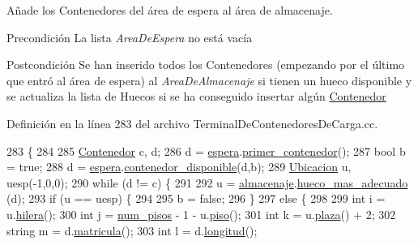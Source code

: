 Añade los Contenedores del área de espera al área de almacenaje. 

\begin{DoxyPrecond}{Precondición}
La lista {\itshape Area\+De\+Espera} no está vacía 
\end{DoxyPrecond}
\begin{DoxyPostcond}{Postcondición}
Se han inserido todos los Contenedores (empezando por el último que entró al área de espera) al {\itshape Area\+De\+Almacenaje} si tienen un hueco disponible y se actualiza la lista de Huecos si se ha conseguido insertar algún \hyperlink{class_contenedor}{Contenedor} 
\end{DoxyPostcond}


Definición en la línea 283 del archivo Terminal\+De\+Contenedores\+De\+Carga.\+cc.


\begin{DoxyCode}
283                                      \{
284     
285     \hyperlink{class_contenedor}{Contenedor} c, d;
286     d = \hyperlink{class_terminal_ac9f71207d73c8d05a9d9d6c046f9f8c3}{espera}.\hyperlink{class_espera_acf8ff210426ca3e799cf667d887e9daa}{primer\_contenedor}();
287     \textcolor{keywordtype}{bool} b = \textcolor{keyword}{true};
288     d = \hyperlink{class_terminal_ac9f71207d73c8d05a9d9d6c046f9f8c3}{espera}.\hyperlink{class_espera_ab4205de26cc518d8130d6506796697ea}{contenedor\_disponible}(d,b);
289     \hyperlink{class_ubicacion}{Ubicacion} u, uesp(-1,0,0);
290     \textcolor{keywordflow}{while} (d != c) \{
291         
292         u = \hyperlink{class_terminal_a1d87d7b16c4f460eee6f1ab73da90fd2}{almacenaje}.\hyperlink{class_almacenaje_a8a62209a8e83a59eb900913c3dc5f377}{hueco\_mas\_adecuado} (d);
293         \textcolor{keywordflow}{if} (u == uesp) \{
294             
295             b = \textcolor{keyword}{false};
296         \}
297         \textcolor{keywordflow}{else} \{
298             
299             \textcolor{keywordtype}{int} i = u.\hyperlink{class_ubicacion_abf00d08075e75ac833de7357ebc6f521}{hilera}();
300             \textcolor{keywordtype}{int} j = \hyperlink{class_terminal_ad6cdee7fe26b4443d45b0a18c345a86d}{num\_pisos} - 1 - u.\hyperlink{class_ubicacion_af6099f8de4dee993e4c9119e1f879070}{piso}();
301             \textcolor{keywordtype}{int} k = u.\hyperlink{class_ubicacion_abed323ffb2eace375e80bc395fdaeb39}{plaza}() + 2;
302             \textcolor{keywordtype}{string} m = d.\hyperlink{class_contenedor_aac5839c94f8d3be8a908740a1af0b716}{matricula}();
303             \textcolor{keywordtype}{int} l = d.\hyperlink{class_contenedor_a203894805dd0b8347f9884990dab0d9d}{longitud}();

\end{DoxyCode}
